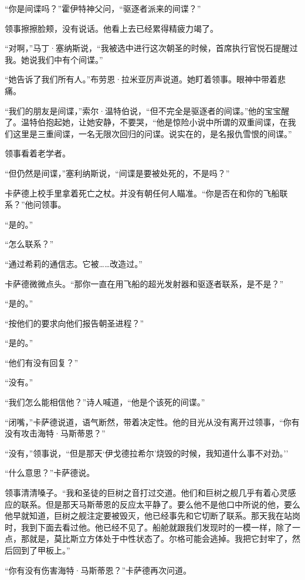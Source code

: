 \documentclass[AutoFakeBold=true]{book}
\begin{document}
\vspace*{1em}

``你是间谍吗？''霍伊特神父问，``驱逐者派来的间谍？''

领事擦擦脸颊，没有说话。他看上去已经累得精疲力竭了。

``对啊，''马丁·塞纳斯说，``我被选中进行这次朝圣的时候，首席执行官悦石提醒过我。她说我们中有个间谍。''

``她告诉了我们所有人。''布劳恩·拉米亚厉声说道。她盯着领事。眼神中带着悲痛。

``我们的朋友是间谍，''索尔·温特伯说，``但不完全是驱逐者的间谍。''他的宝宝醒了。温特伯抱起她，让她安静，不要哭，``他是惊险小说中所谓的双重间谍，在我们这里是三重间谍，一名无限次回归的问谍。说实在的，是名报仇雪恨的间谍。''

领事看着老学者。

``但仍然是间谍，''塞利纳斯说，``间谍是要被处死的，不是吗？''

卡萨德上校手里拿着死亡之杖。并没有朝任何人瞄准。``你是否在和你的飞船联系？''他问领事。

``是的。''

``怎么联系？''

``通过希莉的通信志。它被……改造过。''

卡萨德微微点头。``那你一直在用飞船的超光发射器和驱逐者联系，是不是？''

``是的。''

``按他们的要求向他们报告朝圣进程？''

``是的。''

``他们有没有回复？''

``没有。''

``我们怎么能相信他？''诗人喊道，``他是个该死的间谍。''

``闭嘴，''卡萨德说道，语气断然，带着决定性。他的目光从没有离开过领事，``你有没有攻击海特·马斯蒂恩？''

``没有，''领事说，``但是那天`伊戈德拉希尔'烧毁的时候，我知道什么事不对劲。''

``什么意思？''卡萨德说。

领事清清嗓子。``我和圣徒的巨树之音打过交道。他们和巨树之舰几乎有着心灵感应的联系。但是那天马斯蒂恩的反应太平静了。要么他不是他口中所说的他，要么他早就知道，巨树之舰注定要被毁灭，他已经事先和它切断了联系。那天我在站岗时，我到下面去看过他。他已经不见了。船舱就跟我们发现时的一模一样，除了一点，那就是，莫比斯立方体处于中性状态了。尔格可能会逃掉。我把它封牢了，然后回到了甲板上。''

``你有没有伤害海特·马斯蒂恩？''卡萨德再次问道。
\end{document}
